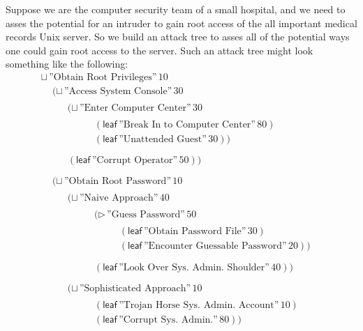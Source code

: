 \documentclass{sigplanconf}
\begin{document}
Suppose we are the computer security team of a small hospital, and we
need to asses the potential for an intruder to gain root access of the
all important medical records Unix server.  So we build an attack tree
to asses all of the potential ways one could gain root access to the
server.  Such an attack tree might look something like the following:
\[
  \begin{array}{lll}
    \sqcup\,\text{''Obtain Root Privileges''}\,10\\
    \,\,\,\,\,\,\,(\sqcup\,\text{''Access System Console''}\,30\\
    \,\,\,\,\,\,\,\,\,\,\,\,\,\,\begin{array}{lll}
    (\sqcup\,\text{''Enter Computer Center''}\,30\\
    \,\,\,\,\,\,\,\,\,\,\,\,\,\,\begin{array}{lll}
    (\mathsf{leaf}\,\text{''Break In to Computer Center''}\,80)\\
    (\mathsf{leaf}\,\text{''Unattended Guest''}\,30))\\
    \end{array}\\
    (\mathsf{leaf}\,\text{''Corrupt Operator''}\,50))\\
    \end{array}\\
    \,\,\,\,\,\,\,(\sqcup\,\text{''Obtain Root Password''}\,10\\
    \,\,\,\,\,\,\,\,\,\,\,\,\,\,\begin{array}{lll}
    (\sqcup\,\text{''Naive Approach''}\,40\\
    \,\,\,\,\,\,\,\,\,\,\,\,\,\,\begin{array}{lll}
    (\rhd\,\text{''Guess Password''}\,50\\
    \,\,\,\,\,\,\,\,\,\,\,\,\,\begin{array}{lll}
    (\mathsf{leaf}\,\text{''Obtain Password File''}\,30)\\
    (\mathsf{leaf}\,\text{''Encounter Guessable Password''}\,20))\\
    \end{array}\\
    (\mathsf{leaf}\,\text{''Look Over Sys. Admin. Shoulder''}\,40))\\
    \end{array}\\
    (\sqcup\,\text{''Sophisticated Approach''}\,10\\
    \,\,\,\,\,\,\,\,\,\,\,\,\,\,\begin{array}{lll}
    (\mathsf{leaf}\,\text{''Trojan Horse Sys. Admin. Account''}\,10)\\
    (\mathsf{leaf}\,\text{''Corrupt Sys. Admin.''}\,80))\\
    \end{array}
    \end{array}
  \end{array}
\]
\end{document}
